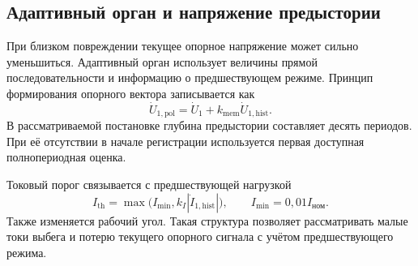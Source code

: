 \subsection{Адаптивный орган и напряжение предыстории}
\label{sec:ch5_adaptive_organ}

{}

При близком повреждении текущее
опорное напряжение может
сильно уменьшиться.
Адаптивный орган использует
величины прямой последовательности
и информацию о предшествующем режиме.
Принцип формирования
опорного вектора записывается как
\begin{equation}
 \dot{U}_{1,\mathrm{pol}}
   =\dot{U}_1+k_{\mathrm{mem}}
                    \dot{U}_{1,\mathrm{hist}}.
 \label{eq:ch5_memory_voltage}
\end{equation}
В рассматриваемой постановке
глубина предыстории составляет
десять периодов.
При её отсутствии в начале
регистрации используется первая
доступная полнопериодная оценка.

Токовый порог связывается
с предшествующей нагрузкой
\begin{equation}
 I_{\mathrm{th}}=
 \max\bigl(I_{\mathrm{min}},
            k_I|\dot{I}_{1,\mathrm{hist}}|\bigr),
 \qquad I_{\mathrm{min}}=0{,}01I_{\text{ном}}.
 \label{eq:ch5_adaptive_threshold}
\end{equation}
Также изменяется рабочий угол.
Такая структура позволяет
рассматривать малые токи выбега
и потерю текущего опорного сигнала
с учётом предшествующего режима.

